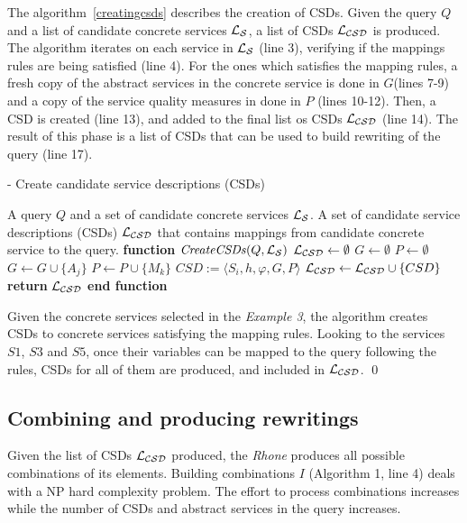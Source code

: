 The algorithm~\ref{creatingcsds} describes the creation of CSDs. Given the query $Q$ and a list of candidate concrete services $\hbox{${\cal L_{S}}$}$, a list of CSDs $\hbox{${\cal L_{CSD}}$}$ is produced. 
The algorithm iterates on each service in $\hbox{${\cal L_{S}}$}$ (line 3), verifying if the mappings rules are being satisfied (line 4). For the ones which satisfies the mapping rules, a fresh copy of the abstract services in the concrete service is done in $G$(lines 7-9) and a copy of the service quality measures in done in $P$ (lines 10-12). Then,
a CSD is created (line 13), and added to the final list os CSDs $\hbox{${\cal L_{CSD}}$}$ (line 14).
The result of this phase is a list of CSDs that can be used to build rewriting of the query (line 17).

\begin{algorithm}
\caption{ - Create candidate service descriptions (CSDs)}
\label{creatingcsds}
\begin{algorithmic}[1]
\REQUIRE A query $Q$ and a set of candidate concrete services $\hbox{${\cal L_{S}}$}$.
\ENSURE A set of candidate service descriptions (CSDs) $\hbox{${\cal L_{CSD}}$}$ that contains mappings from candidate concrete service to the query.
\STATE \textbf{function} $\mathit{CreateCSDs} (Q, \hbox{${\cal L_{S}}$})$
\STATE $\hbox{${\cal L_{CSD}}$} \leftarrow \emptyset$
		\STATE $G \leftarrow \emptyset$	
		\STATE $P \leftarrow \emptyset$		
			\STATE $G \leftarrow G \cup \lbrace A_{j} \rbrace$ 
		\ENDFOR
			\STATE $P \leftarrow P \cup \lbrace M_{k} \rbrace$ 
		\ENDFOR
		\STATE $CSD := \langle S_{i}, h, \varphi, G, P \rangle$	
		\STATE $\hbox{${\cal L_{CSD}}$} \leftarrow \hbox{${\cal L_{CSD}}$} \cup \lbrace CSD \rbrace$	
	\ENDIF
\ENDFOR
\STATE \textbf{return} $\hbox{${\cal L_{CSD}}$}$
\STATE \textbf{end function}
\end{algorithmic}
\end{algorithm}

\begin{example}
Given the concrete services selected in the \textit{Example 3}, the algorithm creates CSDs to concrete services satisfying the mapping rules. 
Looking to the services $S1$, $S3$ and $S5$, once their variables can be mapped to the
query following the rules, CSDs for all of them are produced, and included in $\hbox{${\cal L_{CSD}}$}$.
\qed
\end{example}

\subsection{Combining and producing rewritings}
Given the list of CSDs $\hbox{${\cal L_{CSD}}$}$ produced, the \textit{Rhone} produces all possible combinations of its elements. 
Building combinations $I$ (Algorithm 1, line 4) deals with a NP hard complexity problem.
The effort to process combinations increases while the number of CSDs and abstract services in the query increases.


